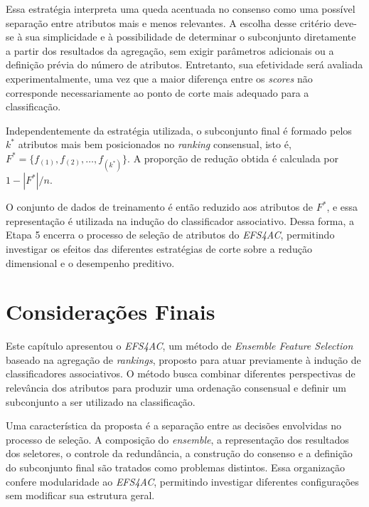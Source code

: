 \begin{enumerate}
    Essa estratégia interpreta uma queda acentuada no consenso como uma possível separação entre atributos mais e menos relevantes. A escolha desse critério deve-se à sua simplicidade e à possibilidade de determinar o subconjunto diretamente a partir dos resultados da agregação, sem exigir parâmetros adicionais ou a definição prévia do número de atributos. Entretanto, sua efetividade será avaliada experimentalmente, uma vez que a maior diferença entre os \textit{scores} não corresponde necessariamente ao ponto de corte mais adequado para a classificação.
\end{enumerate}

Independentemente da estratégia utilizada, o subconjunto final é formado pelos $k^{*}$ atributos mais bem posicionados no \textit{ranking} consensual, isto é, $F^{*}=\{f_{(1)},f_{(2)},\ldots,f_{(k^{*})}\}$. A proporção de redução obtida é calculada por $1-|F^{*}|/n$.

O conjunto de dados de treinamento é então reduzido aos atributos de $F^{*}$, e essa representação é utilizada na indução do classificador associativo. Dessa forma, a Etapa 5 encerra o processo de seleção de atributos do \textit{EFS4AC}, permitindo investigar os efeitos das diferentes estratégias de corte sobre a redução dimensional e o desempenho preditivo.

\section{Considerações Finais}\label{sec:ac-efs-consideracoes}

Este capítulo apresentou o \textit{EFS4AC}, um método de
\textit{Ensemble Feature Selection} baseado na agregação de
\textit{rankings}, proposto para atuar previamente à indução de
classificadores associativos. O método busca combinar diferentes
perspectivas de relevância dos atributos para produzir uma ordenação
consensual e definir um subconjunto a ser utilizado na classificação.

Uma característica da proposta é a separação entre as decisões
envolvidas no processo de seleção. A composição do \textit{ensemble},
a representação dos resultados dos seletores, o controle da
redundância, a construção do consenso e a definição do subconjunto
final são tratados como problemas distintos. Essa organização
confere modularidade ao \textit{EFS4AC}, permitindo investigar
diferentes configurações sem modificar sua estrutura geral.

